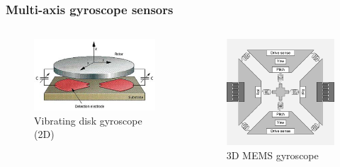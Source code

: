 \documentclass[10pt]{beamer}
\begin{document}
\begin{frame}
\frametitle{Multi-axis gyroscope sensors}
\begin{columns}
    \begin{column}{.58\textwidth}
        \begin{figure}
            \centering
            \includegraphics[width=1.0\linewidth]{vibrating_disk.png}
            \caption{Vibrating disk gyroscope (2D)}
        \end{figure}
    \end{column}
    \hfill
    \begin{column}{.48\textwidth}
        \begin{figure}
            \centering
            \includegraphics[width=1.0\linewidth]{gyro_mems_3in1.png}
            \caption{3D MEMS gyroscope}
        \end{figure}
    \end{column}
\end{columns}
\end{frame}
\end{document}
